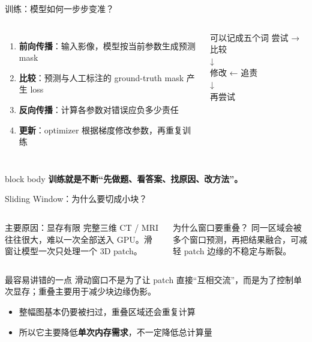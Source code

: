 \documentclass[aspectratio=169,12pt]{beamer}
\newcommand{\key}[1]{\textcolor{BeamerRoyal}{\textbf{#1}}}
\newcommand{\takeaway}[1]{%
  \begin{beamercolorbox}[wd=\linewidth,sep=.16cm,center,rounded=true,shadow=true]{block body}
    \textcolor{BeamerDeep}{\textbf{#1}}
  \end{beamercolorbox}
}
\begin{document}
\begin{frame}{训练：模型如何一步步变准？}
  \begin{columns}[T,onlytextwidth]
      \begin{enumerate}
        \item \key{前向传播}：输入影像，模型按当前参数生成预测 mask
        \item \key{比较}：预测与人工标注的 ground-truth mask 产生 loss
        \item \key{反向传播}：计算各参数对错误应负多少责任
        \item \key{更新}：optimizer 根据梯度修改参数，再重复训练
      \end{enumerate}
      \begin{block}{可以记成五个词}
        \centering
        尝试 → 比较\\[0.10cm]
        {\color{BeamerRoyal}\Large ↓}\\[-0.02cm]
        修改 ← 追责\\[0.10cm]
        {\color{BeamerRoyal}\Large ↓}\\[-0.02cm]
        再尝试
      \end{block}
  \end{columns}

  \vfill
  \takeaway{{\fontsize{11.8}{15.2}\selectfont
    训练就是不断“先做题、看答案、找原因、改方法”。}}
\end{frame}

\begin{frame}{Sliding Window：为什么要切成小块？}
  \begin{columns}[T,onlytextwidth]
      \begin{block}{主要原因：显存有限}
        完整三维 CT / MRI 往往很大，难以一次全部送入 GPU。滑窗让模型一次只处理一个 3D patch。
      \end{block}
      \begin{block}{为什么窗口要重叠？}
        同一区域会被多个窗口预测，再把结果融合，可减轻 patch 边缘的不稳定与断裂。
      \end{block}
  \end{columns}

  \vspace{0.22cm}
  \begin{alertblock}{最容易讲错的一点}
    滑动窗口不是为了让 patch 直接“互相交流”，而是为了控制单次显存；重叠主要用于减少块边缘伪影。
  \end{alertblock}

  \begin{itemize}
    \item 整幅图基本仍要被扫过，重叠区域还会重复计算
    \item 所以它主要降低\key{单次内存需求}，不一定降低总计算量
  \end{itemize}
\end{frame}
\end{document}
